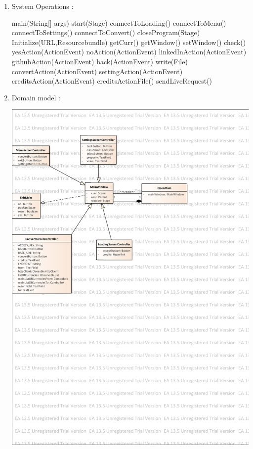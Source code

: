 \documentclass[12pt]{article}
\begin{document}
\begin{enumerate}
\item   System Operations : 

\subitem main(String[] args)
\subitem start(Stage)
\subitem connectToLoading()
\subitem connectToMenu()
\subitem connectToSettings()
\subitem connectToConvert()
\subitem closeProgram(Stage)
\subitem Initialize(URL,Resourcebundle)
\subitem getCurr()
\subitem getWindow()
\subitem setWindow()
\subitem check()
\subitem yesAction(ActionEvent)
\subitem noAction(ActionEvent)
\subitem linkedInAction(ActionEvent)
\subitem githubAction(ActionEvent)
\subitem back(ActionEvent)
\subitem write(File)
\subitem convertAction(ActionEvent)
\subitem settingAction(ActionEvent)
\subitem creditsAction(ActionEvent)
\subitem creditsActionFile()
\subitem sendLiveRequest()



\item   Domain model : 

\newpage
\includegraphics[scale=0.8]{domainModel.pdf}
\newpage



\end{enumerate}
\end{document}
